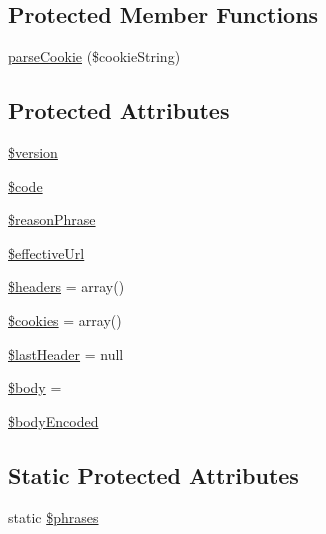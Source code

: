\subsection*{Protected Member Functions}
\begin{DoxyCompactItemize}
\item 
\hyperlink{classHTTP__Request2__Response_a98d67c4a923e69edcfbca9233dd71a81}{parse\+Cookie} (\$cookie\+String)
\end{DoxyCompactItemize}
\subsection*{Protected Attributes}
\begin{DoxyCompactItemize}
\item 
\hyperlink{classHTTP__Request2__Response_aadbcb4df3711846a3b890c5492c4ffe7}{\$version}
\item 
\hyperlink{classHTTP__Request2__Response_a974eeb592b307dca6c7d02e0311832f5}{\$code}
\item 
\hyperlink{classHTTP__Request2__Response_ab9faa50ba9b9f208a02a7c4ce75b391a}{\$reason\+Phrase}
\item 
\hyperlink{classHTTP__Request2__Response_ab87ff3f614066accc95a6f29f23bc051}{\$effective\+Url}
\item 
\hyperlink{classHTTP__Request2__Response_a17017d7d7f6452267ba57ecd0e10fa35}{\$headers} = array()
\item 
\hyperlink{classHTTP__Request2__Response_af1d49532aaf677e27046fafff4f5e985}{\$cookies} = array()
\item 
\hyperlink{classHTTP__Request2__Response_adcf7a1e02f6e5d9eac767466f8551a1e}{\$last\+Header} = null
\item 
\hyperlink{classHTTP__Request2__Response_a3f5cdce9656ed7bd31859b5778169f66}{\$body} = \textquotesingle{}\textquotesingle{}
\item 
\hyperlink{classHTTP__Request2__Response_a1ab2bec927b0ac3d7cf82888479a4fea}{\$body\+Encoded}
\end{DoxyCompactItemize}
\subsection*{Static Protected Attributes}
\begin{DoxyCompactItemize}
\item 
static \hyperlink{classHTTP__Request2__Response_ad9a8fd735e8dc89eb7afc73750ec0bbc}{\$phrases}
\end{DoxyCompactItemize}


